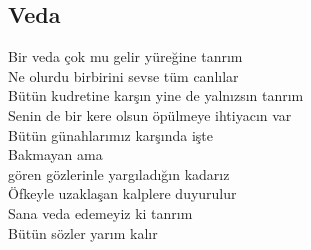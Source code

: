 \subsection{Veda}

Bir veda çok mu gelir yüreğine tanrım \\
Ne olurdu birbirini sevse tüm canlılar \\
Bütün kudretine karşın yine de yalnızsın tanrım \\
Senin de bir kere olsun öpülmeye ihtiyacın var \\

\noindent\newline
Bütün günahlarımız karşında işte \\
Bakmayan ama \\
gören gözlerinle yargıladığın kadarız \\
Öfkeyle uzaklaşan kalplere duyurulur \\
Sana veda edemeyiz ki tanrım \\
Bütün sözler yarım kalır \\